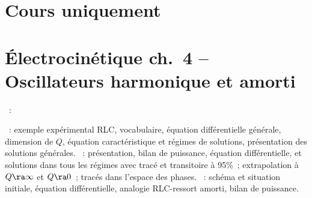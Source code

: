 \documentclass[a4paper, 12pt, final, garamond]{book}
\begin{document}
\section{Cours uniquement}

\section*{Électrocinétique ch.\ 4 -- Oscillateurs harmonique et amorti}
\begin{enumerate}[label=\Roman*, start=2]
  ~:
	\begin{enumerate}[label=\Alph*]
		~: exemple expérimental RLC, vocabulaire, équation
    différentielle générale, dimension de $Q$, équation caractéristique et
    régimes de solutions, présentation des solutions générales.
		~: présentation, bilan de puissance,
    équation différentielle, et solutions dans tous les régimes avec tracé et
    transitoire à 95\%~; extrapolation à $Q \ra \infty$ et $Q \ra 0$~; tracés
    dans l'espace des phases.
    ~: 
    schéma et situation initiale, équation différentielle, analogie RLC-ressort
    amorti, bilan de puissance.
	\end{enumerate}
\end{enumerate}
\end{document}
